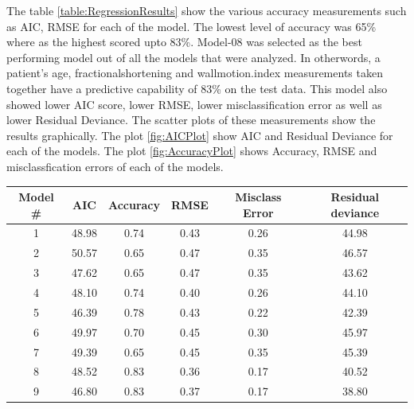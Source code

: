 \documentclass[11pt]{article}
\begin{document}
The table \ref{table:RegressionResults} show the various accuracy measurements such as AIC, RMSE for each of the model. The lowest level of accuracy was 65\% where as the highest scored upto 83\%. Model-08 was selected as the best performing model out of all the models that were analyzed. In otherwords, a patient's age, fractionalshortening and wallmotion.index measurements taken together have a predictive capability of 83\% on the test data. This model also showed lower AIC score, lower RMSE, lower misclassification error as well as lower Residual Deviance. The scatter plots of these measurements show the results graphically. The plot \ref{fig:AICPlot} show AIC and Residual Deviance for each of the models. The plot \ref{fig:AccuracyPlot} shows Accuracy, RMSE and misclassfication errors of each of the models.

\begin{table}[htbp]
\centering
\begin{tabular}{@{}cccccc@{}}
\toprule
\textbf{Model \#} & \textbf{AIC} & \textbf{Accuracy} & \textbf{RMSE} & \textbf{Misclass Error} & \textbf{Residual deviance} \\ \midrule
1                 & 48.98        & 0.74              & 0.43          & 0.26                    & 44.98                      \\
2                 & 50.57        & 0.65              & 0.47          & 0.35                    & 46.57                      \\
3                 & 47.62        & 0.65              & 0.47          & 0.35                    & 43.62                      \\
4                 & 48.10        & 0.74              & 0.40          & 0.26                    & 44.10                      \\
5                 & 46.39        & 0.78              & 0.43          & 0.22                    & 42.39                      \\
6                 & 49.97        & 0.70              & 0.45          & 0.30                    & 45.97                      \\
7                 & 49.39        & 0.65              & 0.45          & 0.35                    & 45.39                      \\
8                 & 48.52        & 0.83              & 0.36          & 0.17                    & 40.52                      \\
9                 & 46.80        & 0.83              & 0.37          & 0.17                    & 38.80                      \\

\end{tabular}
\end{table}
\end{document}
